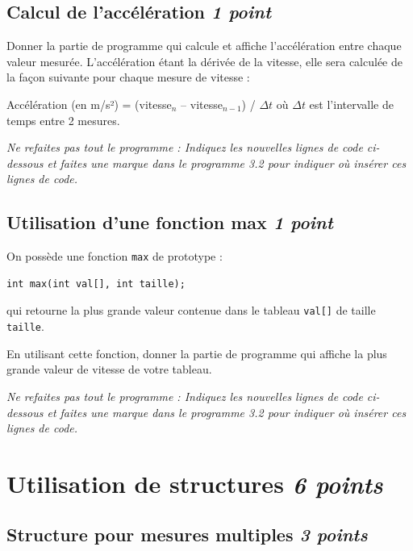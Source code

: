 \espaceReponse{4cm}

\subsection{Calcul de l'accélération \hfill \textit{1 point}}
 
\UPSTIquestion
Donner la partie de programme qui calcule et affiche l'accélération entre chaque valeur mesurée. L'accélération étant la dérivée de la vitesse, elle sera calculée de la façon suivante pour chaque mesure de vitesse :

\begin{center}
    Accélération (en m/s²) = (vitesse$_n$ -- vitesse$_{n-1}$) / $\Delta t$ \quad où $\Delta t$ est l'intervalle de temps entre 2 mesures.
\end{center}

\textit{Ne refaites pas tout le programme : Indiquez les nouvelles lignes de code ci-dessous et faites une marque dans le programme 3.2 pour indiquer où insérer ces lignes de code.}

\espaceReponse{4cm}

\subsection{Utilisation d'une fonction max \hfill \textit{1 point}}

On possède une fonction \texttt{max} de prototype :
\begin{lstlisting}
int max(int val[], int taille);
\end{lstlisting}
qui retourne la plus grande valeur contenue dans le tableau \texttt{val[]} de taille \texttt{taille}.

\UPSTIquestion
En utilisant cette fonction, donner la partie de programme qui affiche la plus grande valeur de vitesse de votre tableau.

\textit{Ne refaites pas tout le programme : Indiquez les nouvelles lignes de code ci-dessous et faites une marque dans le programme 3.2 pour indiquer où insérer ces lignes de code.}

\espaceReponse{3cm}

\ifavecEspaceReponse\pagebreak\fi

\section{Utilisation de structures \hfill \textit{6 points}}

\subsection{Structure pour mesures multiples \hfill \textit{3 points}}

